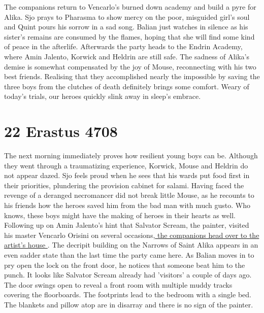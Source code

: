 The companions return to Vencarlo's burned down academy and build a pyre for Alika. Sjo prays to Pharasma to show mercy on the poor, misguided girl's soul and Quint pours his sorrow in a sad song. Balian just watches in silence as his sister's remains are consumed by the flames, hoping that she will find some kind of peace in the afterlife. Afterwards the party heads to the Endrin Academy, where Amin Jalento, Korwick and Heldrin are still safe. The sadness of Alika's demise is somewhat compensated by the joy of Mouse, reconnecting with his two best friends. Realising that they accomplished nearly the impossible by saving the three boys from the clutches of death definitely brings some comfort. Weary of today's trials, our heroes quickly slink away in sleep's embrace.\\

\section{22 Erastus 4708}

The next morning immediately proves how resilient young boys can be. Although they went through a traumatizing experience, Korwick, Mouse and Heldrin do not appear dazed. Sjo feels proud when he sees that his wards put food first in their priorities, plundering the provision cabinet for salami. Having faced the revenge of a deranged necromancer did not break little Mouse, as he recounts to his friends how the heroes saved him from the bad man with much gusto. Who knows, these boys might have the making of heroes in their hearts as well.\\

Following up on Amin Jalento's hint that Salvator Scream, the painter, visited his master Vencarlo Orisini on several occasions,\hyperref[fig:Where-is-Salvator-Scream-562539967]{ the companions head over to the artist's house } . The decripit building on the Narrows of Saint Alika appears in an even sadder state than the last time the party came here. As Balian moves in to pry open the lock on the front door, he notices that someone beat him to the punch. It looks like Salvator Scream already had 'visitors' a couple of days ago. The door swings open to reveal a front room with multiple muddy tracks covering the floorboards. The footprints lead to the bedroom with a single bed. The blankets and pillow atop are in disarray and there is no sign of the painter. \\

